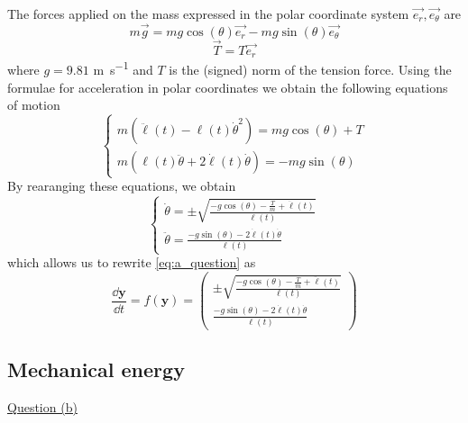 The forces applied on the mass expressed in the polar coordinate system \(\vec{e_r}, \vec{e_\theta}\) are
\begin{equation}
    m\vec{g} = mg \cos(\theta) \vec{e_r} - mg \sin(\theta) \vec{e_\theta}
\end{equation}
\begin{equation}
    \vec{T} = T \vec{e_r}
\end{equation}
where \(g=9.81\) \si{\meter\per\second} and \(T\) is the (signed) norm of the tension force. Using the formulae for acceleration in polar coordinates we obtain the following equations of motion
\begin{equation}
    \begin{cases}
        m(\ddot\ell(t) - \ell(t) \dot\theta^2) = mg\cos(\theta) + T \\
        m(\ell(t)\ddot\theta + 2\dot\ell(t) \dot\theta) = -mg\sin(\theta)
    \end{cases}
    \label{eq:motion}
\end{equation}
By rearanging these equations, we obtain
\begin{equation}
    \begin{cases}
        \dot\theta = \pm \sqrt{\frac{-g\cos(\theta) - \frac{T}{m} + \ddot\ell(t)}{\ell(t)}} \\
        \ddot\theta = \frac{-g\sin(\theta) - 2\dot\ell(t) \dot\theta}{\ell(t)}
    \end{cases}
    \label{eq:thetadot_thetadotdot}
\end{equation}
which allows us to rewrite \autoref{eq:a_question} as
\begin{equation}
    \frac{\dd \textbf{y}}{\dd t} = f(\textbf{y}) = \left(\begin{matrix}
        \pm \sqrt{\frac{-g\cos(\theta) - \frac{T}{m} + \ddot\ell(t)}{\ell(t)}} \\
        \frac{-g\sin(\theta) - 2\dot\ell(t) \dot\theta}{\ell(t)}
    \end{matrix}\right)
    \label{eq:ode}
\end{equation}

\subsection{Mechanical energy}
\underline{Question (b)}

